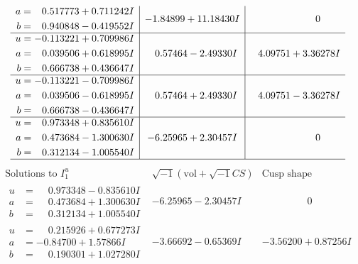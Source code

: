 \documentclass[1p]{elsarticle_modified}
\theoremstyle{definition}
\newcommand{\I}{\sqrt{-1}}
\begin{document}
$$\begin{array}{c|c|c}
\begin{aligned}
a &= \phantom{-}0.517773 + 0.711242 I \\
b &= \phantom{-}0.940848 - 0.419552 I\end{aligned}
 & -1.84899 + 11.18430 I & \phantom{-0.000000 } 0 \\ \hline\begin{aligned}
u &= -0.113221 + 0.709986 I \\
a &= \phantom{-}0.039506 + 0.618995 I \\
b &= \phantom{-}0.666738 + 0.436647 I\end{aligned}
 & \phantom{-}0.57464 - 2.49330 I & \phantom{-}4.09751 + 3.36278 I \\ \hline\begin{aligned}
u &= -0.113221 - 0.709986 I \\
a &= \phantom{-}0.039506 - 0.618995 I \\
b &= \phantom{-}0.666738 - 0.436647 I\end{aligned}
 & \phantom{-}0.57464 + 2.49330 I & \phantom{-}4.09751 - 3.36278 I \\ \hline\begin{aligned}
u &= \phantom{-}0.973348 + 0.835610 I \\
a &= \phantom{-}0.473684 - 1.300630 I \\
b &= \phantom{-}0.312134 - 1.005540 I\end{aligned}
 & -6.25965 + 2.30457 I & \phantom{-0.000000 } 0\\
 \hline 
 \end{array}$$\newpage$$\begin{array}{c|c|c}  
\text{Solutions to }I^u_{1}& \I (\text{vol} + \sqrt{-1}CS) & \text{Cusp shape}\\
 \hline 
\begin{aligned}
u &= \phantom{-}0.973348 - 0.835610 I \\
a &= \phantom{-}0.473684 + 1.300630 I \\
b &= \phantom{-}0.312134 + 1.005540 I\end{aligned}
 & -6.25965 - 2.30457 I & \phantom{-0.000000 } 0 \\ \hline\begin{aligned}
u &= \phantom{-}0.215926 + 0.677273 I \\
a &= -0.84700 + 1.57866 I \\
b &= \phantom{-}0.190301 + 1.027280 I\end{aligned}
 & -3.66692 - 0.65369 I & -3.56200 + 0.87256 I \\ \hline\begin{aligned}

\end{aligned}
\end{array}$$
\end{document}
